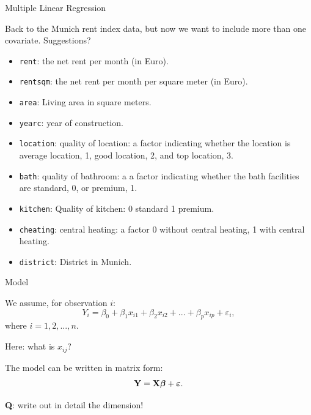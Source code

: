 \documentclass[10pt,ignorenonframetext,]{beamer}
\providecommand{\tightlist}{%
  \setlength{\itemsep}{0pt}\setlength{\parskip}{0pt}}
\begin{document}
\begin{frame}[fragile]{Multiple Linear Regression}

Back to the Munich rent index data, but now we want to include more than
one covariate. Suggestions?

\begin{itemize}
\tightlist
\item
  \texttt{rent}: the net rent per month (in Euro).
\item
  \texttt{rentsqm}: the net rent per month per square meter (in Euro).
\item
  \texttt{area}: Living area in square meters.
\item
  \texttt{yearc}: year of construction.
\item
  \texttt{location}: quality of location: a factor indicating whether
  the location is average location, 1, good location, 2, and top
  location, 3.
\item
  \texttt{bath}: quality of bathroom: a a factor indicating whether the
  bath facilities are standard, 0, or premium, 1.
\item
  \texttt{kitchen}: Quality of kitchen: 0 standard 1 premium.
\item
  \texttt{cheating}: central heating: a factor 0 without central
  heating, 1 with central heating.
\item
  \texttt{district}: District in Munich.
\end{itemize}

\end{frame}

\begin{frame}

\begin{block}{Model}

We assume, for observation \(i\):
\[Y_i= \beta_0 + \beta_{1}  x_{i1} + \beta_2 x_{i2} + ... + \beta_p x_{ip} + \varepsilon_i,\]
where \(i=1,2,...,n\).

Here: what is \(x_{ij}\)?

The model can be written in matrix form:
\[{\bf Y}={\bf X} \boldsymbol{\beta}+{\boldsymbol{\varepsilon}}.\]

\textbf{Q}: write out in detail the dimension!

\end{block}

\end{frame}
\end{document}

